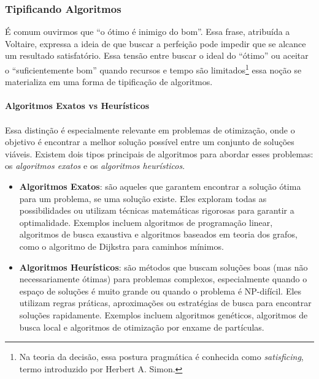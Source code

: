 \documentclass[12pt,a4paper]{article}
\begin{document}
\subsubsection{Tipificando Algoritmos}

É comum ouvirmos que “o ótimo é inimigo do bom”. Essa frase, atribuída a Voltaire, expressa a ideia de que buscar a perfeição pode impedir que se alcance um resultado satisfatório. Essa tensão entre buscar o ideal do “ótimo”  ou aceitar o “suficientemente bom” quando recursos e tempo são limitados\footnote{Na teoria da decisão, essa postura pragmática é conhecida como \emph{satisficing}, termo introduzido por Herbert A. Simon.} essa noção se materializa em uma forma de tipificação de algoritmos.

\paragraph{Algoritmos Exatos vs Heurísticos}

\paragraph{}
Essa distinção é especialmente relevante em problemas de otimização, onde o objetivo é encontrar a melhor solução possível entre um conjunto de soluções viáveis. Existem dois tipos principais de algoritmos para abordar esses problemas: os \emph{algoritmos exatos} e os \emph{algoritmos heurísticos}.

\begin{itemize}\setlength{\itemsep}{2pt}
    \item \textbf{Algoritmos Exatos}: são aqueles que garantem encontrar a solução ótima para um problema, se uma solução existe. Eles exploram todas as possibilidades ou utilizam técnicas matemáticas rigorosas para garantir a optimalidade. Exemplos incluem algoritmos de programação linear, algoritmos de busca exaustiva e algoritmos baseados em teoria dos grafos, como o algoritmo de Dijkstra para caminhos mínimos.
    \item \textbf{Algoritmos Heurísticos}: são métodos que buscam soluções boas (mas não necessariamente ótimas) para problemas complexos, especialmente quando o espaço de soluções é muito grande ou quando o problema é NP-difícil. Eles utilizam regras práticas, aproximações ou estratégias de busca para encontrar soluções rapidamente. Exemplos incluem algoritmos genéticos, algoritmos de busca local e algoritmos de otimização por enxame de partículas.
\end{itemize}
\end{document}
